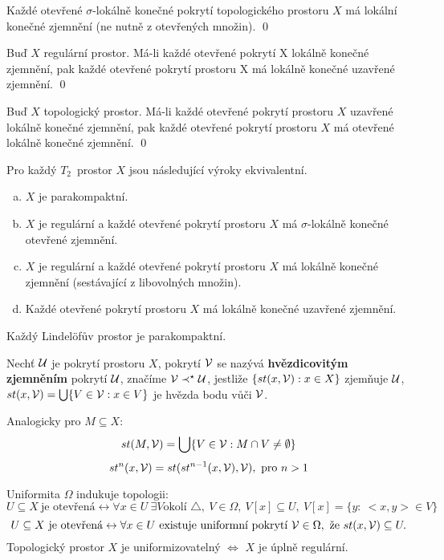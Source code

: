 \documentclass[12pt,a4paper]{article}
\newcommand{\head}[1]{\medskip\noindent {\bf #1}}
\newcommand\Hausd{$T_2$}
\begin{document}
\lemma[1] Každé otevřené $\sigma$-lokálně konečné pokrytí topologického
	prostoru $X$ má lokální konečné zjemnění (ne nutně z otevřených množin).
\dukaz \qed

\lemma[2] Buď $X$ regulární prostor. Má-li každé otevřené pokrytí X lokálně
	konečné zjemnění, pak každé otevřené pokrytí prostoru X má lokálně konečné
	uzavřené zjemnění.
\dukaz \qed

\lemma[3] Buď $X$ topologický prostor. Má-li každé otevřené pokrytí prostoru
	$X$ uzavřené lokálně konečné zjemnění, pak každé otevřené pokrytí prostoru
	$X$ má otevřené lokálně konečné zjemnění.
\dukaz \qed

\begin{veta}
Pro každý \Hausd~prostor $X$ jsou následující výroky ekvivalentní.
	\begin{enumerate}[(a)]
		\item $X$ je parakompaktní.
		\item $X$ je regulární a každé otevřené pokrytí prostoru $X$ má
			$\sigma$-lokálně konečné otevřené zjemnění.
		\item $X$ je regulární a každé otevřené pokrytí prostoru $X$ má lokálně
			konečné zjemnění (sestávající z libovolných množin).
		\item Každé otevřené pokrytí prostoru $X$ má lokálně konečné uzavřené
			zjemnění.
	\end{enumerate}
\end{veta}

\head {Důsledek:} Každý Lindelöfův prostor je parakompaktní.

 Nechť $\mathcal{ U }$ je pokrytí prostoru $X$, pokrytí $\mathcal{ V }$ se nazývá {\bf
	hvězdicovitým zjemněním} pokrytí $\mathcal{ U }$, značíme $\mathcal{ V } \prec^\star \mathcal{ U }$,
	jestliže $\{st(x,\mathcal{ V }) : x \in X\}$ zjemňuje $\mathcal{ U }$, $st(x, \mathcal{ V }) = \bigcup
	\{ V \in \mathcal{ V } : x \in V\}$ je hvězda bodu vůči $\mathcal{ V }$.

	Analogicky pro $M \subseteq X$:
		$$st(M, \mathcal{ V }) = \bigcup \{ V \in \mathcal{ V } : M \cap V \neq \emptyset \}$$
		$$st^n(x, \mathcal{ V }) = st(st^{n-1}(x, \mathcal{ V }), \mathcal{ V }),~\text{pro } n > 1$$

\head {Poznámka:} Uniformita $\Omega$ indukuje topologii:
	$$U \subseteq X~\text{je otevřená} \leftrightarrow \forall x \in U~\exists V \text{okolí } \triangle,~V \in \Omega,~V[x] \subseteq U,~V[x] = \{ y :~<x,y> \in V\}$$
	$$U \subseteq X~\text{je otevřená} \leftrightarrow \forall x \in U~\text{existuje uniformní pokrytí } \mathcal{ V } \in \Omega,\text{ že } st(x, \mathcal{ V }) \subseteq U.$$
	Topologický prostor $X$ je uniformizovatelný $\iff$ $X$ je úplně regulární.
\end{document}
